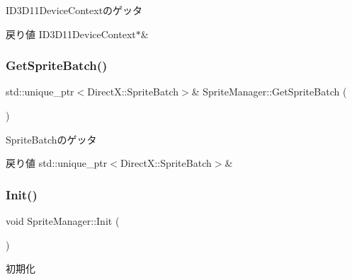 I\+D3\+D11\+Device\+Contextのゲッタ 

\begin{DoxyReturn}{戻り値}
I\+D3\+D11\+Device\+Context$\ast$\& 
\end{DoxyReturn}
\mbox{\label{class_sprite_manager_a0b82bacf33d0b558657c8e9841daf9d9}} 
\subsubsection{\texorpdfstring{Get\+Sprite\+Batch()}{GetSpriteBatch()}}
{\footnotesize\ttfamily std\+::unique\+\_\+ptr$<$Direct\+X\+::\+Sprite\+Batch$>$\& Sprite\+Manager\+::\+Get\+Sprite\+Batch (\begin{DoxyParamCaption}{ }\end{DoxyParamCaption})\hspace{0.3cm}{\ttfamily [inline]}}



Sprite\+Batchのゲッタ 

\begin{DoxyReturn}{戻り値}
std\+::unique\+\_\+ptr$<$\+Direct\+X\+::\+Sprite\+Batch$>$\& 
\end{DoxyReturn}
\mbox{\label{class_sprite_manager_a82941ce284548c762f250220ea58f43c}} 
\subsubsection{\texorpdfstring{Init()}{Init()}}
{\footnotesize\ttfamily void Sprite\+Manager\+::\+Init (\begin{DoxyParamCaption}{ }\end{DoxyParamCaption})}



初期化 

\mbox{\label{class_sprite_manager_a4cdd5540bace32d5742ea4df648d87e9}} 
